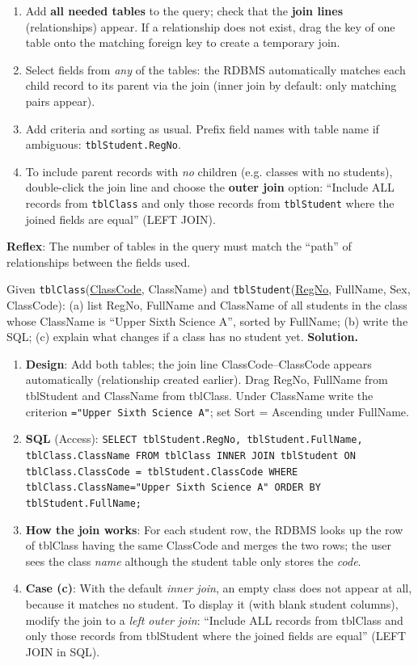\documentclass[11pt]{article}
\begin{document}
\begin{methode}
\begin{enumerate}
\item Add \textbf{all needed tables} to the query; check that the \textbf{join lines} (relationships) appear. If a relationship does not exist, drag the key of one table onto the matching foreign key to create a temporary join.
\item Select fields from \emph{any} of the tables: the RDBMS automatically matches each child record to its parent via the join (inner join by default: only matching pairs appear).
\item Add criteria and sorting as usual. Prefix field names with table name if ambiguous: \texttt{tblStudent.RegNo}.
\item To include parent records with \emph{no} children (e.g. classes with no students), double-click the join line and choose the \textbf{outer join} option: ``Include ALL records from \texttt{tblClass} and only those records from \texttt{tblStudent} where the joined fields are equal'' (LEFT JOIN).
\end{enumerate}
\textbf{Reflex}: The number of tables in the query must match the ``path'' of relationships between the fields used.
\end{methode}

\begin{exoresolu}
Given \texttt{tblClass}(\underline{ClassCode}, ClassName) and \texttt{tblStudent}(\underline{RegNo}, FullName, Sex, ClassCode): (a) list RegNo, FullName and ClassName of all students in the class whose ClassName is ``Upper Sixth Science A'', sorted by FullName; (b) write the SQL; (c) explain what changes if a class has no student yet.
\tcblower
\textbf{Solution.}
\begin{enumerate}
\item \textbf{Design}: Add both tables; the join line ClassCode--ClassCode appears automatically (relationship created earlier). Drag RegNo, FullName from tblStudent and ClassName from tblClass. Under ClassName write the criterion \texttt{="Upper Sixth Science A"}; set Sort = Ascending under FullName.
\item \textbf{SQL} (Access):
\texttt{SELECT tblStudent.RegNo, tblStudent.FullName, tblClass.ClassName FROM tblClass INNER JOIN tblStudent ON tblClass.ClassCode = tblStudent.ClassCode WHERE tblClass.ClassName="Upper Sixth Science A" ORDER BY tblStudent.FullName;}
\item \textbf{How the join works}: For each student row, the RDBMS looks up the row of tblClass having the same ClassCode and merges the two rows; the user sees the class \emph{name} although the student table only stores the \emph{code}.
\item \textbf{Case (c)}: With the default \emph{inner join}, an empty class does not appear at all, because it matches no student. To display it (with blank student columns), modify the join to a \emph{left outer join}: ``Include ALL records from tblClass and only those records from tblStudent where the joined fields are equal'' (LEFT JOIN in SQL).
\end{enumerate}
\end{exoresolu}
\end{document}

